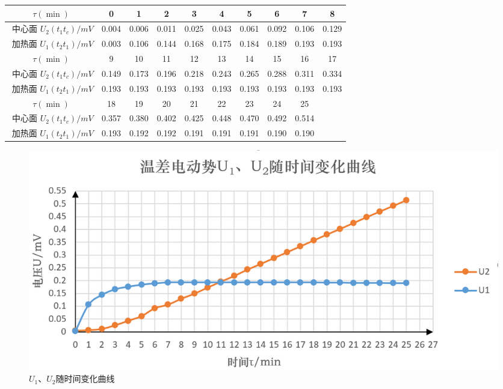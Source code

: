\documentclass[UTF8]{ctexart}
\begin{document}
\begin{tabular}{|c|c|c|c|c|c|c|c|c|c|}
    \hline $\tau(\min )$ & 0 & 1 & 2 & 3 & 4 & 5 & 6 & 7 & 8 \\
    \hline $\text { 中心面 } U_2\left(t_{1} t_{c}\right) / m V$ & 0.004 & 0.006 & 0.011 & 0.025 & 0.043 & 0.061 & 0.092 & 0.106 & 0.129 \\
    \hline $\text { 加热面 } U_1\left(t_{2} t_{1}\right) / m V$ & 0.003 & 0.106 & 0.144 & 0.168 & 0.175 & 0.184 & 0.189 & 0.193 & 0.193 \\
    \hline $\tau(\min )$ & 9 & 10 & 11 & 12 & 13 & 14 & 15 & 16 & 17 \\
    \hline $\text { 中心面 } U_2\left(t_{1} t_{c}\right) / m V$ & 0.149 & 0.173 & 0.196 & 0.218 & 0.243 & 0.265 & 0.288 & 0.311 & 0.334 \\
    \hline $\text { 加热面 } U_1\left(t_{2} t_{1}\right) / m V$ & 0.193 & 0.193 & 0.193 & 0.193 & 0.193 & 0.193 & 0.193 & 0.193 & 0.193 \\
    \hline $\tau(\min )$ & 18 & 19 & 20 & 21 & 22 & 23 & 24 & 25 & \\
    \hline $\text { 中心面 } U_2\left(t_{1} t_{c}\right) / m V$ & 0.357 & 0.380 & 0.402 & 0.425 & 0.448 & 0.470 & 0.492 & 0.514 & \\
    \hline $\text { 加热面 } U_1\left(t_{2} t_{1}\right) / m V$ & 0.193 & 0.192 & 0.192 & 0.191 & 0.191 & 0.191 & 0.190 & 0.190 & \\
    \hline
\end{tabular}



\begin{figure}[H]
    \centering
    \includegraphics[scale=0.8]{绘图.png}
    \caption{$U_1$、$U_2$随时间变化曲线}
    \label{fig:label}
\end{figure}
\end{document}
